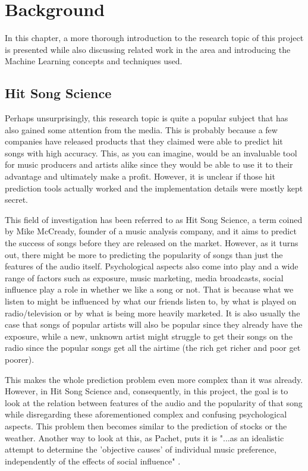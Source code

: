 \chapter{Background}
In this chapter, a more thorough introduction to the research topic of this project is presented while also discussing related work in the area and introducing the Machine Learning concepts and techniques used.
\section{Hit Song Science}
Perhaps unsurprisingly, this research topic is quite a popular subject that has also gained some attention from the media. This is probably because a few companies have released products that they claimed were able to predict hit songs with high accuracy. This, as you can imagine, would be an invaluable tool for music producers and artists alike since they would be able to use it to their advantage and ultimately make a profit. However, it is unclear if those hit prediction tools actually worked and the implementation details were mostly kept secret.

This field of investigation has been referred to as Hit Song Science, a term coined by Mike McCready, founder of a music analysis company, and it aims to predict the success of songs before they are released on the market. However, as it turns out, there might be more to predicting the popularity of songs than just the features of the audio itself. Psychological aspects also come into play and a wide range of factors such as exposure, music marketing, media broadcasts, social influence play a role in whether we like a song or not. That is because what we listen to might be influenced by what our friends listen to, by what is played on radio/television or by what is being more heavily marketed. It is also usually the case that songs of popular artists will also be popular since they already have the exposure, while a new, unknown artist might struggle to get their songs on the radio since the popular songs get all the airtime (the rich get richer and poor get poorer). 

This makes the whole prediction problem even more complex than it was already. However, in Hit Song Science and, consequently, in this project, the goal is to look at the relation between features of the audio and the popularity of that song while disregarding these aforementioned complex and confusing psychological aspects. This problem then becomes similar to the prediction of stocks or the weather. Another way to look at this, as Pachet, puts it is "...as an idealistic attempt to determine the 'objective causes' of individual music preference, independently of the effects of social influence"  \cite{li_music_2011}.

